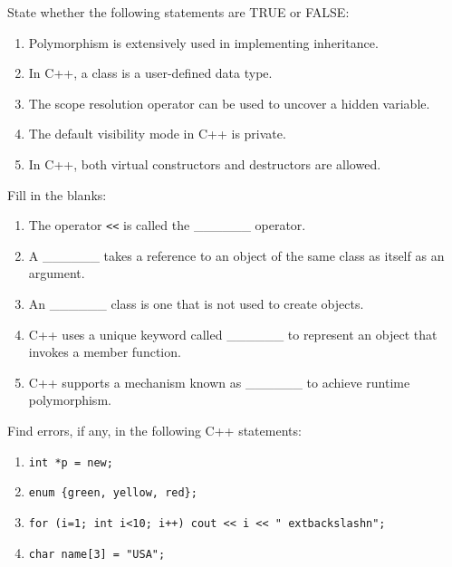 \documentclass[11pt,a4paper]{article}
\begin{document}
\begin{parts}
  \item State whether the following statements are TRUE or FALSE:
  
\begin{enumerate}[label=(\roman*),itemsep=2pt]
    \item Polymorphism is extensively used in implementing inheritance.
    \item In C++, a class is a user-defined data type.
    \item The scope resolution operator can be used to uncover a hidden variable.
    \item The default visibility mode in C++ is private.
    \item In C++, both virtual constructors and destructors are allowed.
  \end{enumerate}
  
  \item Fill in the blanks:
  
\begin{enumerate}[label=(\roman*),itemsep=2pt]
    \item The operator   \texttt{<<} is called the \_\_\_\_\_\_ operator.
    \item A \_\_\_\_\_\_ takes a reference to an object of the same class as itself as an argument.
    \item An \_\_\_\_\_\_ class is one that is not used to create objects.
    \item C++ uses a unique keyword called \_\_\_\_\_\_ to represent an object that invokes a member function.
    \item C++ supports a mechanism known as \_\_\_\_\_\_ to achieve runtime polymorphism.
  \end{enumerate}
  
  \item Find errors, if any, in the following C++ statements:
  
\begin{enumerate}[label=(\roman*),itemsep=2pt]
    \item   \texttt{int *p = new;}
    \item   \texttt{enum \{green, yellow, red\};}
    \item   \texttt{for (i=1; int i<10; i++) cout << i << " extbackslash{}n";}
    \item   \texttt{char name[3] = "USA";}
  \end{enumerate}
\end{parts}
\end{document}
